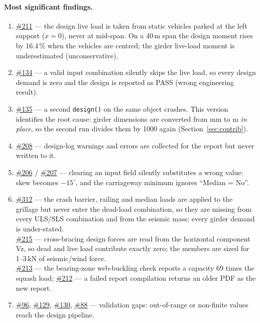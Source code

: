 \documentclass[11pt,a4paper]{article}
\newcommand{\issue}[1]{\href{https://github.com/Nidhikhare12/OsdagBridge/issues/#1}{\##1}}
\begin{document}
\paragraph{Most significant findings.}
\begin{enumerate}[nosep]
  \item \issue{211} --- the design live load is taken from static vehicles parked at the left support ($x = 0$), never at mid-span. On a 40\,m span the design moment rises by 16.4\,\% when the vehicles are centred; the girder live-load moment is underestimated (unconservative).
  \item \issue{134} --- a valid input combination silently skips the live load, so every design demand is zero and the design is reported as PASS (wrong engineering result).
  \item \issue{135} --- a second \texttt{design()} on the same object crashes. This version identifies the root cause: girder dimensions are converted from mm to m \emph{in place}, so the second run divides them by 1000 again (Section~\ref{sec:contrib}).
  \item \issue{208} --- design-log warnings and errors are collected for the report but never written to it.
  \item \issue{206} / \issue{207} --- clearing an input field silently substitutes a wrong value: skew becomes $-15^\circ$, and the carriageway minimum ignores ``Median = No''.
  \item \issue{312} --- the crash barrier, railing and median loads are applied to the grillage but never enter the dead-load combination, so they are missing from every ULS/SLS combination and from the seismic mass; every girder demand is under-stated.\\ \issue{215} --- cross-bracing design forces are read from the horizontal component Vz, so dead and live load contribute exactly zero; the members are sized for 1--3\,kN of seismic/wind force.\\ \issue{213} --- the bearing-zone web-buckling check reports a capacity 69 times the squash load; \issue{212} --- a failed report compilation returns an older PDF as the new report.
  \item \issue{96}, \issue{129}, \issue{130}, \issue{88} --- validation gaps: out-of-range or non-finite values reach the design pipeline.
\end{enumerate}

\end{document}
